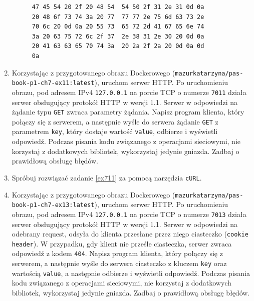 \documentclass{article}
\begin{document}
\begin{enumerate}[label=\textbf{7.\arabic*}]
\begin{figure}[h!t!p!]
\centering
\begin{BVerbatim}
47 45 54 20 2f 20 48 54  54 50 2f 31 2e 31 0d 0a   
20 48 6f 73 74 3a 20 77  77 77 2e 75 6d 63 73 2e   
70 6c 20 0d 0a 20 55 73  65 72 2d 41 67 65 6e 74   
3a 20 63 75 72 6c 2f 37  2e 38 31 2e 30 20 0d 0a  
20 41 63 63 65 70 74 3a  20 2a 2f 2a 20 0d 0a 0d   
0a
\end{BVerbatim}
\end{figure}

\item \label{ex711} Korzystając z przygotowanego obrazu Dockerowego (\texttt{mazurkatarzyna/pas-book-p1-ch7-ex11:latest}), uruchom serwer HTTP.  Po uruchomieniu obrazu, pod adresem IPv4 \texttt{127.0.0.1} na porcie TCP o numerze \texttt{7011} działa serwer obsługujący protokół HTTP w wersji 1.1. Serwer w odpowiedzi na żądanie typu \texttt{GET} zwraca parametry żądania. Napisz program klienta, który połączy się z serwerem, a następnie wyśle do serwera żądanie \texttt{GET} z parametrem \texttt{key}, który dostaje wartość \texttt{value}, odbierze i wyświetli odpowiedź.  Podczas pisania kodu związanego z operacjami sieciowymi, nie korzystaj z dodatkowych bibliotek, wykorzystaj jedynie gniazda. Zadbaj o prawidłową obsługę błędów.


\item Spróbuj rozwiązać zadanie \ref{ex711} za pomocą narzędzia \texttt{cURL}. 

\item \label{ex713}  Korzystając z przygotowanego obrazu Dockerowego (\texttt{mazurkatarzyna/pas-book-p1-ch7-ex13:latest}), uruchom serwer HTTP.  Po uruchomieniu obrazu, pod adresem IPv4 \texttt{127.0.0.1} na porcie TCP o numerze \texttt{7013} działa serwer obsługujący protokół HTTP w wersji 1.1. Serwer w odpowiedzi na odebrany request, odsyła do klienta przesłane przez niego ciasteczko (\texttt{cookie header}). W przypadku, gdy klient nie prześle ciasteczka, serwer zwraca odpowiedź z kodem \texttt{404}. Napisz program klienta, który połączy się z serwerem, a następnie wyśle do serwera ciasteczko z kluczem \texttt{key} oraz wartością \texttt{value}, a następnie odbierze i wyświetli odpowiedź.  Podczas pisania kodu związanego z operacjami sieciowymi, nie korzystaj z dodatkowych bibliotek, wykorzystaj jedynie gniazda. Zadbaj o prawidłową obsługę błędów.


\end{enumerate}
\end{document}
